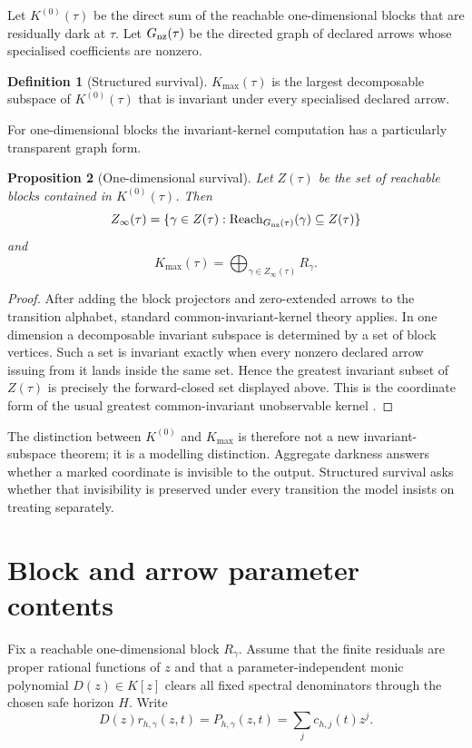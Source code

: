 \documentclass[11pt]{article}
\newtheorem{proposition}{Proposition}[section]
\theoremstyle{definition}
\newtheorem{definition}[proposition]{Definition}
\theoremstyle{remark}
\newcommand{\Kzero}{K^{(0)}}
\newcommand{\Kmax}{K_{\max}}
\begin{document}
Let $\Kzero(\tau)$ be the direct sum of the reachable one-dimensional blocks that are residually dark at $\tau$. Let $G_{\rm nz}(\tau)$ be the directed graph of declared arrows whose specialised coefficients are nonzero.

\begin{definition}[Structured survival]
$\Kmax(\tau)$ is the largest decomposable subspace of $\Kzero(\tau)$ that is invariant under every specialised declared arrow.
\end{definition}

For one-dimensional blocks the invariant-kernel computation has a particularly transparent graph form.

\begin{proposition}[One-dimensional survival]\label{prop:survival}
Let $Z(\tau)$ be the set of reachable blocks contained in $\Kzero(\tau)$. Then
\[
Z_\infty(\tau)=\{\gamma\in Z(\tau):
\operatorname{Reach}_{G_{\rm nz}(\tau)}(\gamma)\subseteq Z(\tau)\}
\]
and
\[
\Kmax(\tau)=\bigoplus_{\gamma\in Z_\infty(\tau)}R_\gamma.
\]
\end{proposition}

\begin{proof}
After adding the block projectors and zero-extended arrows to the transition alphabet, standard common-invariant-kernel theory applies. In one dimension a decomposable invariant subspace is determined by a set of block vertices. Such a set is invariant exactly when every nonzero declared arrow issuing from it lands inside the same set. Hence the greatest invariant subset of $Z(\tau)$ is precisely the forward-closed set displayed above. This is the coordinate form of the usual greatest common-invariant unobservable kernel \parencite{Petreczky2013}.
\end{proof}

The distinction between $\Kzero$ and $\Kmax$ is therefore not a new invariant-subspace theorem; it is a modelling distinction. Aggregate darkness answers whether a marked coordinate is invisible to the output. Structured survival asks whether that invisibility is preserved under every transition the model insists on treating separately.

\section{Block and arrow parameter contents}\label{sec:content}

Fix a reachable one-dimensional block $R_\gamma$. Assume that the finite residuals are proper rational functions of $z$ and that a parameter-independent monic polynomial $D(z)\in K[z]$ clears all fixed spectral denominators through the chosen safe horizon $H$. Write
\begin{equation}\label{eq:Ph}
D(z)r_{h,\gamma}(z,t)=P_{h,\gamma}(z,t)
=\sum_j c_{h,j}(t)z^j.
\end{equation}
\end{document}

